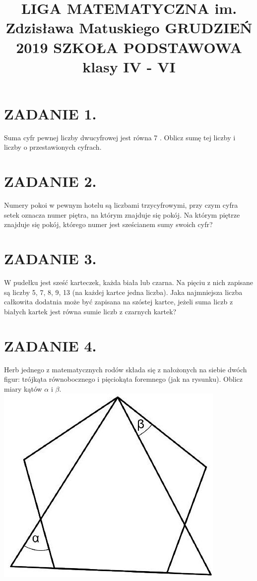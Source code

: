\documentclass[10pt]{article}
\title{LIGA MATEMATYCZNA im. Zdzisława Matuskiego GRUDZIEŃ 2019 SZKOŁA PODSTAWOWA \\
 klasy IV - VI }
\author{}
\date{}
\begin{document}
\maketitle
\section*{ZADANIE 1.}
Suma cyfr pewnej liczby dwucyfrowej jest równa 7 . Oblicz sumę tej liczby i liczby o przestawionych cyfrach.

\section*{ZADANIE 2.}
Numery pokoi w pewnym hotelu są liczbami trzycyfrowymi, przy czym cyfra setek oznacza numer piętra, na którym znajduje się pokój. Na którym piętrze znajduje się pokój, którego numer jest sześcianem sumy swoich cyfr?

\section*{ZADANIE 3.}
W pudełku jest sześć karteczek, każda biała lub czarna. Na pięciu z nich zapisane są liczby 5, 7, 8, 9, 13 (na każdej kartce jedna liczba). Jaka najmniejsza liczba całkowita dodatnia może być zapisana na szóstej kartce, jeżeli suma liczb z białych kartek jest równa sumie liczb z czarnych kartek?

\section*{ZADANIE 4.}
Herb jednego z matematycznych rodów składa się z nałożonych na siebie dwóch figur: trójkąta równobocznego i pięciokąta foremnego (jak na rysunku). Oblicz miary kątów \(\alpha\) i \(\beta\).\\
\includegraphics[max width=\textwidth, center]{2024_11_21_57c1852a5ff6e5801ef3g-1(1)}
\end{document}
